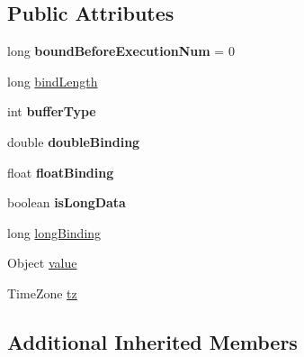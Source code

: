 \subsection*{Public Attributes}
\begin{DoxyCompactItemize}
\item 
\mbox{\label{classcom_1_1mysql_1_1cj_1_1_server_prepared_query_bind_value_a3ab8f65eaf859a7ff98183e245cae9ac}} 
long {\bfseries bound\+Before\+Execution\+Num} = 0
\item 
long \mbox{\hyperlink{classcom_1_1mysql_1_1cj_1_1_server_prepared_query_bind_value_aa87bf817b49e78e7fb23da67b0f34acb}{bind\+Length}}
\item 
\mbox{\label{classcom_1_1mysql_1_1cj_1_1_server_prepared_query_bind_value_a4dd8969b65d3c51f18e5ee05f6754aa7}} 
int {\bfseries buffer\+Type}
\item 
\mbox{\label{classcom_1_1mysql_1_1cj_1_1_server_prepared_query_bind_value_aa49ba26e72e2d7780a5b9f915a4ad1c1}} 
double {\bfseries double\+Binding}
\item 
\mbox{\label{classcom_1_1mysql_1_1cj_1_1_server_prepared_query_bind_value_abd77ba808c6e9ad053f1d0f4046deb07}} 
float {\bfseries float\+Binding}
\item 
\mbox{\label{classcom_1_1mysql_1_1cj_1_1_server_prepared_query_bind_value_ab22e024ff3b3820378df1262c46608b7}} 
boolean {\bfseries is\+Long\+Data}
\item 
long \mbox{\hyperlink{classcom_1_1mysql_1_1cj_1_1_server_prepared_query_bind_value_a2ee1b71337514a7edd370aab5cdc7003}{long\+Binding}}
\item 
Object \mbox{\hyperlink{classcom_1_1mysql_1_1cj_1_1_server_prepared_query_bind_value_aa595f7da76ae912b08b89998edc62018}{value}}
\item 
Time\+Zone \mbox{\hyperlink{classcom_1_1mysql_1_1cj_1_1_server_prepared_query_bind_value_ab5b37e608f04a2ebd03addfcbd53c536}{tz}}
\end{DoxyCompactItemize}
\subsection*{Additional Inherited Members}


